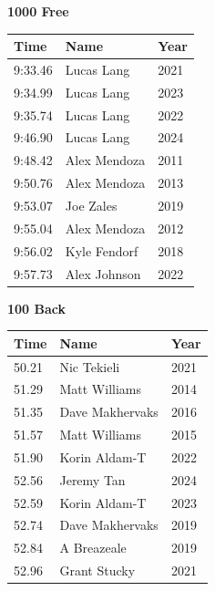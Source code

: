 \vspace{1.2em}
\noindent\begin{minipage}[t]{0.48\textwidth}
\centering
\textbf{\textcolor{teamprimary}{1000 Free}}\par
\vspace{0.5em}
\centering
\small
\renewcommand{\arraystretch}{1.0}
\setlength{\tabcolsep}{4pt}
\begin{tabular}{@{}p{1.8cm}p{3.0cm}p{1.0cm}@{}}
\toprule
\textbf{Time} & \textbf{Name} & \textbf{Year} \\
\midrule
9:33.46 & Lucas Lang & 2021 \\
9:34.99 & Lucas Lang & 2023 \\
9:35.74 & Lucas Lang & 2022 \\
9:46.90 & Lucas Lang & 2024 \\
9:48.42 & Alex Mendoza & 2011 \\
9:50.76 & Alex Mendoza & 2013 \\
9:53.07 & Joe Zales & 2019 \\
9:55.04 & Alex Mendoza & 2012 \\
9:56.02 & Kyle Fendorf & 2018 \\
9:57.73 & Alex Johnson & 2022 \\
\bottomrule
\end{tabular}
\end{minipage}
\hfill
\begin{minipage}[t]{0.48\textwidth}
\centering
\textbf{\textcolor{teamprimary}{100 Back}}\par
\vspace{0.5em}
\centering
\small
\renewcommand{\arraystretch}{1.0}
\setlength{\tabcolsep}{4pt}
\begin{tabular}{@{}p{1.8cm}p{3.0cm}p{1.0cm}@{}}
\toprule
\textbf{Time} & \textbf{Name} & \textbf{Year} \\
\midrule
50.21 & Nic Tekieli & 2021 \\
51.29 & Matt Williams & 2014 \\
51.35 & Dave Makhervaks & 2016 \\
51.57 & Matt Williams & 2015 \\
51.90 & Korin Aldam-T & 2022 \\
52.56 & Jeremy Tan & 2024 \\
52.59 & Korin Aldam-T & 2023 \\
52.74 & Dave Makhervaks & 2019 \\
52.84 & A Breazeale & 2019 \\
52.96 & Grant Stucky & 2021 \\
\bottomrule
\end{tabular}
\end{minipage}
